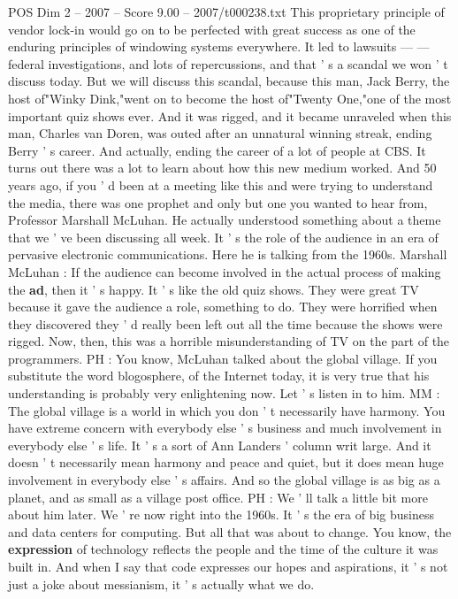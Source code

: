 \begin{textsample}{POS Dim 2 – 2007 – Score 9.00 – 2007/t000238.txt}
This proprietary principle of vendor lock-in would go on to be perfected with great success as one of the enduring principles of windowing systems everywhere.
It led to lawsuits — — federal investigations, and lots of repercussions, and that ' s a scandal we won ' t discuss today.
But we will discuss this scandal, because this man, Jack Berry, the host of"Winky Dink,"went on to become the host of"Twenty One,"one of the most important quiz shows ever.
And it was rigged, and it became unraveled when this man, Charles van Doren, was outed after an unnatural winning streak, ending Berry ' s career.
And actually, ending the career of a lot of people at CBS.
It turns out there was a lot to learn about how this new medium worked.
And 50 years ago, if you ' d been at a meeting like this and were trying to understand the media, there was one prophet and only but one you wanted to hear from, Professor Marshall McLuhan.
He actually understood something about a theme that we ' ve been discussing all week.
It ' s the role of the audience in an era of pervasive electronic communications.
Here he is talking from the 1960s.
Marshall McLuhan : If the audience can become involved in the actual process of making the \textbf{ad}, then it ' s happy.
It ' s like the old quiz shows.
They were great TV because it gave the audience a role, something to do.
They were horrified when they discovered they ' d really been left out all the time because the shows were rigged.
Now, then, this was a horrible misunderstanding of TV on the part of the programmers.
PH : You know, McLuhan talked about the global village.
If you substitute the word blogosphere, of the Internet today, it is very true that his understanding is probably very enlightening now.
Let ' s listen in to him.
MM : The global village is a world in which you don ' t necessarily have harmony.
You have extreme concern with everybody else ' s business and much involvement in everybody else ' s life.
It ' s a sort of Ann Landers ' column writ large.
And it doesn ' t necessarily mean harmony and peace and quiet, but it does mean huge involvement in everybody else ' s affairs.
And so the global village is as big as a planet, and as small as a village post office.
PH : We ' ll talk a little bit more about him later.
We ' re now right into the 1960s.
It ' s the era of big business and data centers for computing.
But all that was about to change.
You know, the \textbf{expression} of technology reflects the people and the time of the culture it was built in.
And when I say that code expresses our hopes and aspirations, it ' s not just a joke about messianism, it ' s actually what we do.

\end{textsample}
